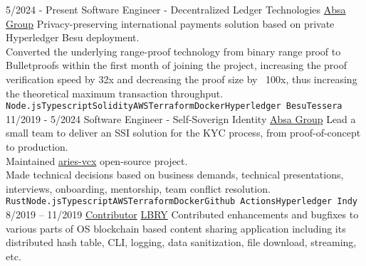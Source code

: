 \documentclass[9pt]{developercv} %
\begin{document}


\begin{entrylist}
	\entry
		{5/2024 - Present}
        {Software Engineer - Decentralized Ledger Technologies}
        {\href{https://www.absa.co.za/}{Absa Group}}
        {
          Privacy-preserving international payments solution based on private Hyperledger Besu deployment.\\
          Converted the underlying range-proof technology from binary range proof to Bulletproofs within the first month of joining the project, increasing the proof verification speed by 32x and decreasing the proof size by ~100x, thus increasing the theoretical maximum transaction throughput.\\
          \texttt{Node.js}\slashsep\texttt{Typescript}\slashsep\texttt{Solidity}\slashsep\texttt{AWS}\slashsep\texttt{Terraform}\slashsep\texttt{Docker}\slashsep\texttt{Hyperledger Besu}\slashsep\texttt{Tessera}
        }
	\entry
		{11/2019 - 5/2024}
        {Software Engineer - Self-Soverign Identity}
        {\href{https://www.absa.co.za/}{Absa Group}}
        {
          Lead a small team to deliver an SSI solution for the KYC process, from proof-of-concept to production.\\
          Maintained \href{https://github.com/hyperledger/aries-vcx}{aries-vcx} open-source project.\\
          Made technical decisions based on business demands, technical presentations, interviews, onboarding, mentorship, team conflict resolution.\\
          \texttt{Rust}\slashsep\texttt{Node.js}\slashsep\texttt{Typescript}\slashsep\texttt{AWS}\slashsep\texttt{Terraform}\slashsep\texttt{Docker}\slashsep\texttt{Github Actions}\slashsep\texttt{Hyperledger Indy}
        }
	\entry
		{8/2019 -- 11/2019}
        {\href{https://github.com/lbryio/lbry-sdk/pulls?utf8=\%E2\%9C\%93\&q=is\%3Apr+author\%3Amirgee+}{Contributor}}
        {\href{https://github.com/lbryio/lbry-sdk/pulls?utf8=\%E2\%9C\%93\&q=is\%3Apr+author\%3Amirgee+}{LBRY}}
        {
          Contributed enhancements and bugfixes to various parts of OS blockchain based content sharing application including its distributed hash table, CLI, logging, data sanitization, file download, streaming, etc.\\
}
\end{entrylist}
\end{document}
